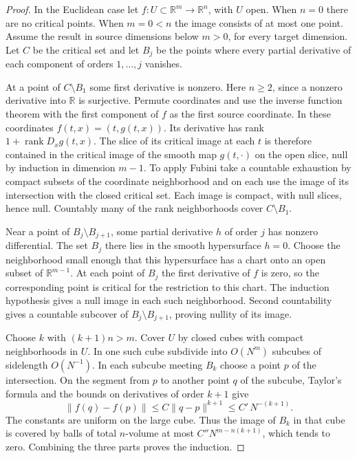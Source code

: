 \documentclass[11pt,oneside,openany]{book}
\theoremstyle{definition}
\theoremstyle{remark}
\newcommand{\R}{\mathbb R}
\begin{document}
\begin{proof}
In the Euclidean case let \(f:U\subset\R^m\to\R^n\), with \(U\) open. When \(n=0\) there are no critical points. When \(m=0<n\) the image consists of at most one point. Assume the result in source dimensions below \(m>0\), for every target dimension. Let \(C\) be the critical set and let \(B_j\) be the points where every partial derivative of each component of orders \(1,\ldots,j\) vanishes.

At a point of \(C\setminus B_1\) some first derivative is nonzero. Here \(n\geq2\), since a nonzero derivative into \(\R\) is surjective. Permute coordinates and use the inverse function theorem with the first component of \(f\) as the first source coordinate. In these coordinates \(f(t,x)=(t,g(t,x))\). Its derivative has rank \(1+\operatorname{rank}D_xg(t,x)\). The slice of its critical image at each \(t\) is therefore contained in the critical image of the smooth map \(g(t,\cdot)\) on the open slice, null by induction in dimension \(m-1\). To apply Fubini take a countable exhaustion by compact subsets of the coordinate neighborhood and on each use the image of its intersection with the closed critical set. Each image is compact, with null slices, hence null. Countably many of the rank neighborhoods cover \(C\setminus B_1\).

Near a point of \(B_j\setminus B_{j+1}\), some partial derivative \(h\) of order \(j\) has nonzero differential. The set \(B_j\) there lies in the smooth hypersurface \(h=0\). Choose the neighborhood small enough that this hypersurface has a chart onto an open subset of \(\R^{m-1}\). At each point of \(B_j\) the first derivative of \(f\) is zero, so the corresponding point is critical for the restriction to this chart. The induction hypothesis gives a null image in each such neighborhood. Second countability gives a countable subcover of \(B_j\setminus B_{j+1}\), proving nullity of its image.

Choose \(k\) with \((k+1)n>m\). Cover \(U\) by closed cubes with compact neighborhoods in \(U\). In one such cube subdivide into \(O(N^m)\) subcubes of sidelength \(O(N^{-1})\). In each subcube meeting \(B_k\) choose a point \(p\) of the intersection. On the segment from \(p\) to another point \(q\) of the subcube, Taylor's formula and the bounds on derivatives of order \(k+1\) give
\[
 \lVert f(q)-f(p)\rVert\leq C\lVert q-p\rVert^{k+1}
 \leq C'\,N^{-(k+1)}.
\]
The constants are uniform on the large cube. Thus the image of \(B_k\) in that cube is covered by balls of total \(n\)-volume at most \(C''N^{m-n(k+1)}\), which tends to zero. Combining the three parts proves the induction.


\end{proof}
\end{document}
